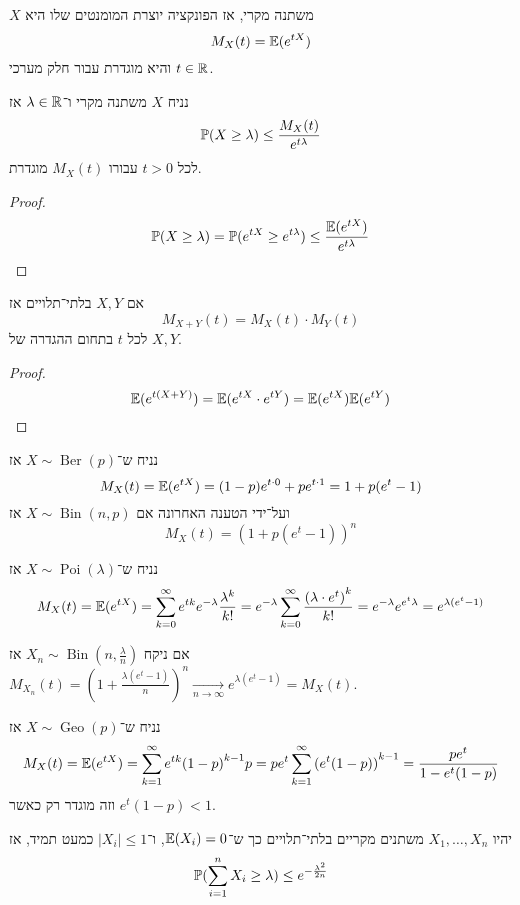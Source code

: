 \begin{definition}
	$X$ משתנה מקרי, אז הפונקציה יוצרת המומנטים שלו היא
	\[
		M_X(t) = \mathbb{E}(e^{tX})
	\]
	והיא מוגדרת עבור חלק מערכי $t \in \mathbb{R}$.
\end{definition}
\begin{proposition}
	נניח $X$ משתנה מקרי ו־$\lambda \in \mathbb{R}$ אז
	\[
		\mathbb{P}(X \ge \lambda)
		\le \frac{M_X(t)}{e^{t\lambda}}
	\]
	לכל $t > 0$ עבורו $M_X(t)$ מוגדרת.
\end{proposition}
\begin{proof}
	\[
		\mathbb{P}(X \ge \lambda)
		= \mathbb{P}(e^{tX} \ge e^{t\lambda})
		\le \frac{\mathbb{E}(e^{tX})}{e^{t\lambda}}
	\]
\end{proof}
\begin{proposition}
	אם $X, Y$ בלתי־תלויים אז
	\[
		M_{X + Y}(t) = M_X(t) \cdot M_Y(t)
	\]
	לכל $t$ בתחום ההגדרה של $X, Y$.
\end{proposition}
\begin{proof}
	\[
		\mathbb{E}(e^{t(X + Y)})
		= \mathbb{E}(e^{tX} \cdot e^{tY})
		= \mathbb{E}(e^{tX}) \mathbb{E}(e^{tY})
	\]
\end{proof}
\begin{example}
	נניח ש־$X \sim \operatorname{Ber}(p)$ אז
	\[
		M_X(t)
		= \mathbb{E}(e^{tX})
		= (1 - p) e^{t \cdot 0} + p e^{t \cdot 1}
		= 1 + p(e^t - 1)
	\]
	ועל־ידי הטענה האחרונה אם $X \sim \operatorname{Bin}(n, p)$ אז
	\[
		M_X(t)
		= {(1 + p(e^t - 1))}^n
	\]
\end{example}
\begin{example}
	נניח ש־$X \sim \operatorname{Poi}(\lambda)$ אז
	\[
		M_X(t)
		= \mathbb{E}(e^{tX})
		= \sum_{k = 0}^{\infty} e^{tk} e^{-\lambda} \frac{\lambda^k}{k!}
		= e^{-\lambda} \sum_{k = 0}^{\infty} \frac{{(\lambda \cdot e^t)}^k}{k!}
		= e^{-\lambda} e^{e^t \lambda}
		= e^{\lambda(e^t - 1)}
	\]
\end{example}
\begin{remark}
	אם ניקח $X_n \sim \operatorname{Bin}(n, \frac{\lambda}{n})$ אז $M_{X_n}(t) = {(1 + \frac{\lambda(e^t - 1)}{n})}^n \xrightarrow[n \to \infty]{} e^{\lambda(e^t - 1)} = M_X(t)$.
\end{remark}
\begin{example}
	נניח ש־$X \sim \operatorname{Geo}(p)$ אז
	\[
		M_X(t)
		= \mathbb{E}(e^{tX})
		= \sum_{k = 1}^{\infty} e^{tk} {(1 - p)}^{k - 1} p
		= p e^t \sum_{k = 1}^{\infty} {(e^t (1 - p))}^{k - 1}
		= \frac{p e^t}{1 - e^t(1 - p)}
	\]
	וזה מוגדר רק כאשר $e^t(1 - p) < 1$.
\end{example}
\begin{theorem}\label{hofding_inequality_theorem}
	יהיו $X_1, \dots, X_n$ משתנים מקריים בלתי־תלויים כך ש־$\mathbb{E}(X_i) = 0$, ו־$|X_i| \le 1$ כמעט תמיד, אז
	\[
		\mathbb{P}(\sum_{i = 1}^{n} X_i \ge \lambda)
		\le e^{-\frac{\lambda^2}{2n}}
	\]
\end{theorem}
